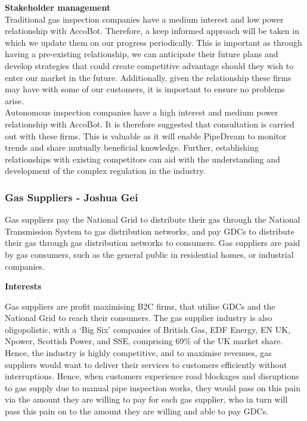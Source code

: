 \documentclass[11pt]{article}		%
\begin{document}
            \textbf{Stakeholder management}\\
            Traditional gas inspection companies have a medium interest and low power relationship with AccoBot. Therefore, a keep informed approach will be taken in which we update them on our progress periodically. This is important as through having a pre-existing relationship, we can anticipate their future plans and develop strategies that could create competitive advantage should they wish to enter our market in the future. Additionally, given the relationship these firms may have with some of our customers, it is important to ensure no problems arise. \\
            \hspace*{3ex}Autonomous inspection companies have a high interest and medium power relationship with AccoBot. It is therefore suggested that consultation is carried out with these firms. This is valuable as it will enable PipeDream to monitor trends and share mutually beneficial knowledge. Further, establishing relationships with existing competitors can aid with the understanding and development of the complex regulation in the industry.

		\subsubsection[Gas Suppliers]{Gas Suppliers - Joshua Gei}
		Gas suppliers pay the National Grid to distribute their gas through the National Transmission System to gas distribution networks, and pay GDCs to distribute their gas through gas distribution networks to consumers. Gas suppliers are paid by gas consumers, such as the general public in residential homes, or industrial companies.   
		
		\textbf{Interests}
		
	    Gas suppliers are profit maximising B2C firms, that utilise GDCs and the National Grid to reach their consumers. The gas supplier industry is also oligopolistic, with a ‘Big Six’ companies of British Gas, EDF Energy, EN UK, Npower, Scottish Power, and SSE, comprising 69\% of the UK market share. 
        \\Hence, the industry is highly competitive, and to maximise revenues, gas suppliers would want to deliver their services to customers efficiently without interruptions. Hence, when customers experience road blockages and disruptions to gas supply due to manual pipe inspection works, they would pass on this pain via the amount they are willing to pay for each gas supplier, who in turn will pass this pain on to the amount they are willing and able to pay GDCs.
        
\end{document}
